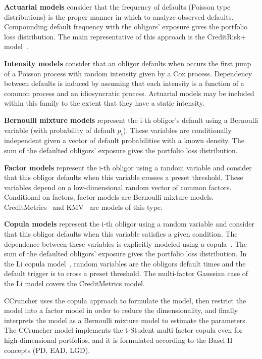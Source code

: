\documentclass[11pt,fleqn]{book} %
\begin{document}
\textbf{Actuarial models} consider that the frequency of defaults (Poisson type 
distributions) is the proper manner in which to analyze observed defaults. 
Compounding default frequency with the obligors' exposure gives the
portfolio loss distribution. The main representative of this approach is 
the CreditRisk+ model~\cite{creditrisk+:1997}.

\textbf{Intensity models} consider that an obligor defaults when occurs the first 
jump of a Poisson process with random intensity given by a Cox process.
Dependency between defaults is induced by assuming that each intensity
is a function of a common process and an idiosyncratic process. Actuarial 
models may be included within this family to the extent that they have a 
static intensity.

\textbf{Bernoulli mixture models} represent the i-th obligor's default using a 
Bernoulli variable (with probability of default $p_i$). These variables are 
conditionally independent given a vector of default probabilities with a known 
density. The sum of the defaulted obligors' exposure gives the portfolio loss 
distribution.

\textbf{Factor models} represent the i-th obligor using a random variable and
consider that this obligor defaults when this variable crosses a preset 
threshold. These variables depend on a low-dimensional random vector of 
common factors. Conditional on factors, factor models are Bernoulli mixture 
models. CreditMetrics\texttrademark{}~\cite{cmetrics:1997} and 
KMV~\cite{kmv:2003} are models of this type. 

\textbf{Copula models} represent the i-th obligor using a random variable and
consider that this obligor defaults when this variable satisfies a given 
condition. The dependence between these variables is explicitly modeled using 
a copula~\cite{embrechts:2002}. The sum of the defaulted obligors' exposure 
gives the portfolio loss distribution. In the Li copula model~\cite{li:2000}, 
random variables are the obligors default times and the default trigger is to 
cross a preset threshold. The multi-factor Gaussian case of the Li model covers 
the CreditMetrics\texttrademark{} model.

CCruncher uses the copula approach to formulate the model, then restrict the 
model into a factor model in order to reduce the dimensionality, and finally 
interprets the model as a Bernoulli mixture model to estimate the parameters.
The CCruncher model implements the t-Student multi-factor copula even for 
high-dimensional portfolios, and it is formulated according to the Basel II 
concepts (PD, EAD, LGD).
\end{document}
